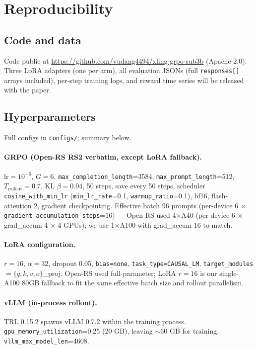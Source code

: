 
\section{Reproducibility}
\label{sec:reproducibility}

\subsection{Code and data}
Code public at \url{https://github.com/vudang4494/xling-grpo-sub3b} (Apache-2.0).
Three LoRA adapters (one per arm), all evaluation JSONs (full \texttt{responses[]}
arrays included), per-step training logs, and reward time series will be released
with the paper.

\subsection{Hyperparameters}
Full configs in \texttt{configs/}; summary below.

\paragraph{GRPO (Open-RS RS2 verbatim, except LoRA fallback).}
$\text{lr}=10^{-6}$, $G{=}6$, \texttt{max\_completion\_length}=3584,
\texttt{max\_prompt\_length}=512, $T_{\text{rollout}}=0.7$, KL $\beta{=}0.04$, 50 steps,
save every 50 steps, scheduler \texttt{cosine\_with\_min\_lr}
(\texttt{min\_lr\_rate}=0.1, \texttt{warmup\_ratio}=0.1), bf16, flash-attention 2,
gradient checkpointing. Effective batch 96 prompts (per-device 6 $\times$
\texttt{gradient\_accumulation\_steps}=16) --- Open-RS used 4$\times$A40 (per-device 6
$\times$ grad\_accum 4 $\times$ 4 GPUs); we use 1$\times$A100 with grad\_accum 16
to match.

\paragraph{LoRA configuration.} $r{=}16$, $\alpha{=}32$, dropout 0.05,
\texttt{bias=none}, \texttt{task\_type=CAUSAL\_LM}, \texttt{target\_modules}
$=\{q, k, v, o\}$\_proj. Open-RS used full-parameter; LoRA $r{=}16$ is our
single-A100 80GB fallback to fit the same effective batch size and rollout
parallelism.

\paragraph{vLLM (in-process rollout).} TRL 0.15.2 spawns vLLM 0.7.2 within the
training process. \texttt{gpu\_memory\_utilization}=0.25 (20 GB), leaving
$\sim$60 GB for training. \texttt{vllm\_max\_model\_len}=4608.

